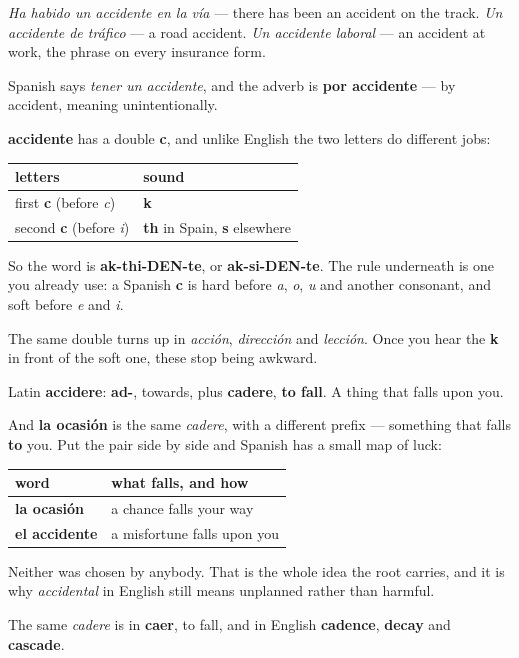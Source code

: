 \emph{Ha habido un accidente en la vía} — there has been an accident on the track. \emph{Un accidente de tráfico} — a road accident. \emph{Un accidente laboral} — an accident at work, the phrase on every insurance form.

Spanish says \emph{tener un accidente}, and the adverb is \textbf{por accidente} — by accident, meaning unintentionally.

\begin{grammarlens}[title={Grammar Lens: -cc- is two sounds, not one}]
\textbf{accidente} has a double \textbf{c}, and unlike English the two letters do different jobs:

\noindent
\begin{tabularx}{\linewidth}{@{}>{\raggedright\arraybackslash}X>{\raggedright\arraybackslash}X@{}}
\toprule
\textbf{letters} & \textbf{sound} \\
\midrule
first \textbf{c} (before \emph{c}) & \textbf{k} \\
second \textbf{c} (before \emph{i}) & \textbf{th} in Spain, \textbf{s} elsewhere \\
\bottomrule
\end{tabularx}

So the word is \textbf{ak-thi-DEN-te}, or \textbf{ak-si-DEN-te}. The rule underneath is one you already use: a Spanish \textbf{c} is hard before \emph{a}, \emph{o}, \emph{u} and another consonant, and soft before \emph{e} and \emph{i}.

The same double turns up in \emph{acción}, \emph{dirección} and \emph{lección}. Once you hear the \textbf{k} in front of the soft one, these stop being awkward.
\end{grammarlens}

\begin{cousinweb}
Latin \textbf{accidere}: \textbf{ad-}, towards, plus \textbf{cadere}, \textbf{to fall}. A thing that falls upon you.

And \textbf{la ocasión} is the same \emph{cadere}, with a different prefix — something that falls \textbf{to} you. Put the pair side by side and Spanish has a small map of luck:

\noindent
\begin{tabularx}{\linewidth}{@{}>{\raggedright\arraybackslash}X>{\raggedright\arraybackslash}X@{}}
\toprule
\textbf{word} & \textbf{what falls, and how} \\
\midrule
\textbf{la ocasión} & a chance falls your way \\
\textbf{el accidente} & a misfortune falls upon you \\
\bottomrule
\end{tabularx}

Neither was chosen by anybody. That is the whole idea the root carries, and it is why \emph{accidental} in English still means unplanned rather than harmful.

The same \emph{cadere} is in \textbf{caer}, to fall, and in English \textbf{cadence}, \textbf{decay} and \textbf{cascade}.
\end{cousinweb}

